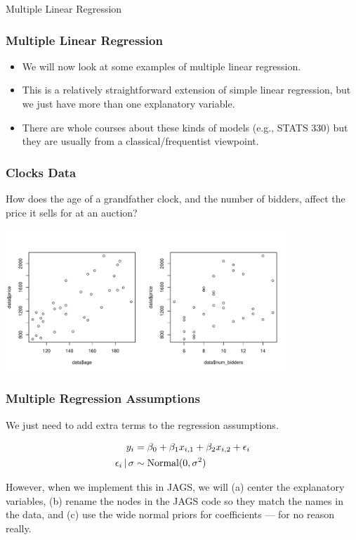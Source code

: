 \documentclass{beamer}
\newcommand{\given}{\,|\,}
\begin{document}
\begin{frame}

\Large
\begin{center}
Multiple Linear Regression
\end{center}

\end{frame}



\begin{frame}
\frametitle{Multiple Linear Regression}
\begin{itemize}
\item We will now look at some examples of multiple linear regression.\pause
\item This is a relatively straightforward extension of simple linear
regression, but we just have more than one explanatory variable.\pause
\item There are whole courses about these kinds of models (e.g., STATS 330)
but they are usually from a classical/frequentist viewpoint.
\end{itemize}
\end{frame}



\begin{frame}
\frametitle{Clocks Data}
How does the age of a grandfather clock, and the number of bidders,
affect the price it sells for at an auction?

\begin{center}
\includegraphics[width=0.8\textwidth]{images/clocks.pdf}
\end{center}

\end{frame}


\begin{frame}
\frametitle{Multiple Regression Assumptions}
We just need to add extra terms to the regression assumptions.

\begin{align}
y_i &= \beta_0 + \beta_1 x_{i, 1} + \beta_2 x_{i, 2} + \epsilon_i \\
\epsilon_i \given \sigma &\sim \textnormal{Normal}(0, \sigma^2)
\end{align}

\pause

However, when we implement this in JAGS, we will (a) center the
explanatory variables, (b) rename the nodes in the JAGS code
so they match the names in the data, and (c) use the wide
normal priors for coefficients --- for no reason really.

\end{frame}
\end{document}
